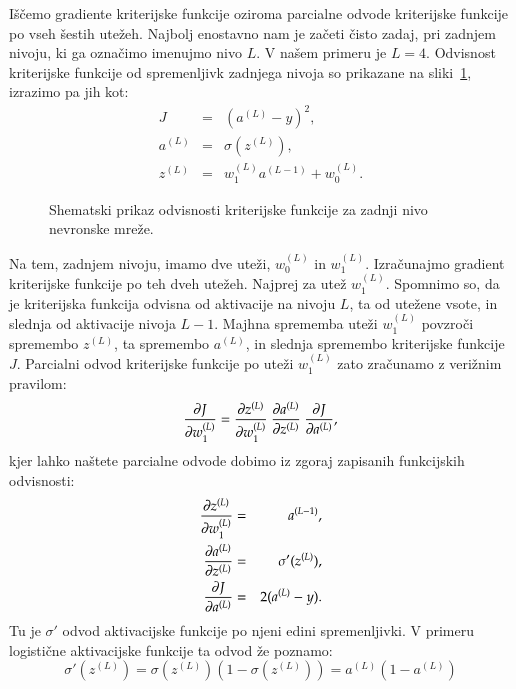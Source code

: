 Iščemo gradiente kriterijske funkcije oziroma parcialne odvode kriterijske funkcije po vseh šestih utežeh. Najbolj enostavno nam je začeti čisto zadaj, pri zadnjem nivoju, ki ga označimo imenujmo nivo $L$. V našem primeru je $L=4$. Odvisnost kriterijske funkcije od spremenljivk zadnjega nivoja so prikazane na sliki~\ref{f-nn-zadnji}, izrazimo pa jih kot:
\begin{eqnarray}
J & = & (a^{(L)}-y)^2, \\
a^{(L)} & = & \sigma(z^{(L)}), \\
z^{(L)} & = & w_1^{(L)} a^{(L-1)} + w_0^{(L)}.
\end{eqnarray}

\begin{figure}
\caption{Shematski prikaz odvisnosti kriterijske funkcije za zadnji nivo nevronske mreže.}
\label{f-nn-zadnji}
\end{figure}

Na tem, zadnjem nivoju, imamo dve uteži, $w_0^{(L)}$ in $w_1^{(L)}$. Izračunajmo gradient kriterijske funkcije po teh dveh utežeh. Najprej za utež $w_1^{(L)}$. Spomnimo so, da je kriterijska funkcija odvisna od aktivacije na nivoju $L$, ta od utežene vsote, in slednja od aktivacije nivoja $L-1$. Majhna sprememba uteži $w_1^{(L)}$ povzroči spremembo $z^{(L)}$, ta spremembo $a^{(L)}$, in slednja spremembo kriterijske funkcije $J$. Parcialni odvod kriterijske funkcije po uteži $w_1^{(L)}$ zato zračunamo z verižnim pravilom:
\begin{equation}
\frac{\partial J}{\partial w_1^{(L)}} = \frac{\partial z^{(L)}}{\partial w_1^{(L)}}\ \frac{\partial a^{(L)}}{\partial z^{(L)}}\ \frac{\partial J}{\partial a^{(L)}},
\end{equation}
\noindent kjer lahko naštete parcialne odvode dobimo iz zgoraj zapisanih funkcijskih odvisnosti:
\begin{eqnarray}
\pd{z^{(L)}}{w_1^{(L)}} & = & a^{(L-1)}, \\
\pd{a^{(L)}}{z^{(L)}} & = & \sigma'(z^{(L)}), \\
\pd{J}{a^{(L)}} & = & 2(a^{(L)}-y).    %
\end{eqnarray}
\noindent Tu je $\sigma'$ odvod aktivacijske funkcije po njeni edini spremenljivki. V primeru logistične aktivacijske funkcije ta odvod že poznamo:
\begin{equation}
\sigma'(z^{(L)})=\sigma(z^{(L)})(1-\sigma(z^{(L)}))=a^{(L)}(1-a^{(L)})
\end{equation}

